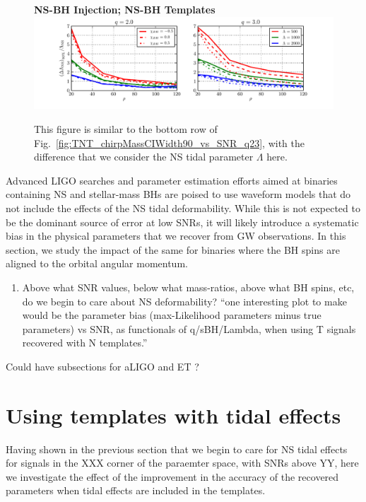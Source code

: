 \documentclass[aps,prd,amsmath,floats,floatfix, twocolumn,
superscriptaddress,nofootinbib,showpacs]{revtex4-1}
\begin{document}
\begin{figure}
\centering
\textbf{NS-BH Injection; NS-BH Templates}
\includegraphics[width=2\columnwidth]{plots/TT_NSLambdaCIWidth90_vs_SNR_q23.pdf}
\caption{This figure is similar to the bottom row of
Fig.~\ref{fig:TNT_chirpMassCIWidth90_vs_SNR_q23}, with the difference that  
we consider the NS tidal parameter $\Lambda$ here.}
\label{fig:TT_NSLambdaCIWidth90_vs_SNR_q23}
\end{figure}
% 
% 
Advanced LIGO searches and parameter estimation efforts aimed at binaries 
containing NS and stellar-mass BHs are poised to use waveform models that do not
include the effects of the NS tidal deformability. While this is not expected to
be the dominant source of error at low SNRs, it will likely introduce a
systematic bias in the physical parameters that we recover from GW observations.
In this section, we study the impact of the same for binaries where the BH spins
are aligned to the orbital angular momentum.

\begin{enumerate}
\item Above what SNR values, below what mass-ratios, above what BH spins, etc, 
do we begin to care about NS deformability?\newline
``one interesting plot to make would be the parameter bias (max-Likelihood
parameters minus true parameters) vs SNR, as functionals of q/sBH/Lambda, when
using T signals recovered with N templates.''
\end{enumerate}


Could have subsections for aLIGO and ET ?

\section{Using templates with tidal effects}
Having shown in the previous section that we begin to care for NS tidal effects
for signals in the XXX corner of the paraemter space, with SNRs above YY, here
we investigate the effect of the improvement in the accuracy of the recovered
parameters when tidal effects are included in the templates.
\end{document}
